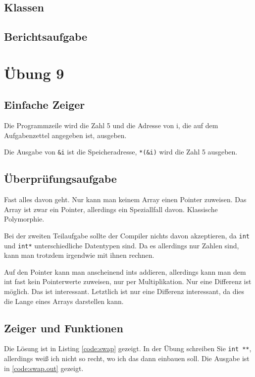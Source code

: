 

\section{Klassen}


\section{Berichtsaufgabe}

\chapter{Übung 9}

\section{Einfache Zeiger}

Die Programmzeile wird die Zahl 5 und die Adresse von i, die auf dem Aufgabenzettel angegeben ist, ausgeben.

Die Ausgabe von \verb#&i# ist die Speicheradresse, \verb#*(&i)# wird die Zahl 5 ausgeben.

\section{Überprüfungsaufgabe}

Fast alles davon geht. Nur kann man keinem Array einen Pointer zuweisen. Das Array ist zwar ein Pointer, allerdings ein Speziallfall davon. Klassische Polymorphie.

Bei der zweiten Teilaufgabe sollte der Compiler nichts davon akzeptieren, da \texttt{int} und \texttt{int*} unterschiedliche Datentypen sind. Da es allerdings nur Zahlen sind, kann man trotzdem irgendwie mit ihnen rechnen.

Auf den Pointer kann man anscheinend ints addieren, allerdings kann man dem int fast kein Pointerwerte zuweisen, nur per Multiplikation. Nur eine Differenz ist möglich. Das ist interessant. Letztlich ist nur eine Differenz interessant, da dies die Lange eines Arrays darstellen kann.

\section{Zeiger und Funktionen}

Die Lösung ist in Listing \ref{code:swap} gezeigt. In der Übung schreiben Sie \texttt{int **}, allerdings weiß ich nicht so recht, wo ich das dann einbauen soll. Die Ausgabe ist in \ref{code:swap.out} gezeigt.


